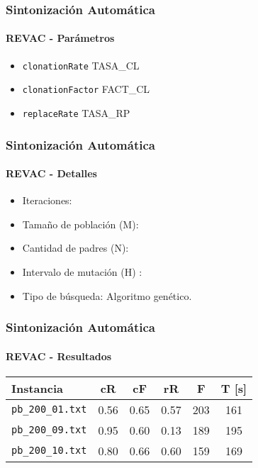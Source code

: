 \frame
{
\frametitle{Sintonización Automática}
\framesubtitle{REVAC - Parámetros}
\begin{itemize}
    \item \texttt{clonationRate} TASA\_CL \blue{[0,1]}
    \item \texttt{clonationFactor} FACT\_CL \blue{[0,1]}
    \item \texttt{replaceRate} TASA\_RP \blue{[0,1]}
\end{itemize}
}


\frame
{
\frametitle{Sintonización Automática}
\framesubtitle{REVAC - Detalles}

\begin{itemize}
    \item Iteraciones: 
    \item Tamaño de población (M): 
    \item Cantidad de padres (N): 
    \item Intervalo de mutación (H) : 
    \item Tipo de búsqueda: Algoritmo genético.
\end{itemize}

}

\frame
{
\frametitle{Sintonización Automática}
\framesubtitle{REVAC - Resultados}
\begin{center}
\begin{tabular}{|l|c|c|c|c|c|}
    \hline
    \textbf{Instancia} & \textbf{cR} & \textbf{cF} & \textbf{rR} & \textbf{F} & \textbf{T [s]} \\\hline
    \texttt{pb\_200\_01.txt} & 0.56 & 0.65 & 0.57 & 203 & 161 \\\hline
    \texttt{pb\_200\_09.txt} & 0.95 & 0.60 & 0.13 & 189 & 195 \\\hline
    \texttt{pb\_200\_10.txt} & 0.80 & 0.66 & 0.60 & 159 & 169\\\hline
\end{tabular}
\end{center}


}
